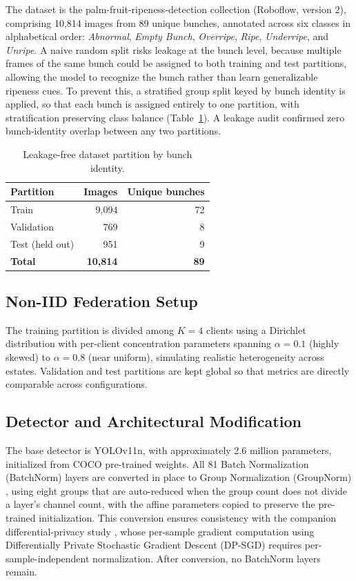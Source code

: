 \documentclass[9pt,twocolumn]{extarticle}
\begin{document}
The dataset is the palm-fruit-ripeness-detection collection (Roboflow, version 2), comprising 10,814 images from 89 unique bunches, annotated across six classes in alphabetical order: \emph{Abnormal}, \emph{Empty Bunch}, \emph{Overripe}, \emph{Ripe}, \emph{Underripe}, and \emph{Unripe}. A naive random split risks leakage at the bunch level, because multiple frames of the same bunch could be assigned to both training and test partitions, allowing the model to recognize the bunch rather than learn generalizable ripeness cues. To prevent this, a stratified group split keyed by bunch identity is applied, so that each bunch is assigned entirely to one partition, with stratification preserving class balance (Table~\ref{tab:split}). A leakage audit confirmed zero bunch-identity overlap between any two partitions.

\begin{table}[H]
  \centering
  \caption{Leakage-free dataset partition by bunch identity.}
  \label{tab:split}
  \small
  \begin{tabular}{lrr}
    \toprule
    Partition & Images & Unique bunches \\
    \midrule
    Train & 9,094 & 72 \\
    Validation & 769 & 8 \\
    Test (held out) & 951 & 9 \\
    \midrule
    \textbf{Total} & \textbf{10,814} & \textbf{89} \\
    \bottomrule
  \end{tabular}
\end{table}

\subsection{Non-IID Federation Setup}

The training partition is divided among $K=4$ clients using a Dirichlet distribution with per-client concentration parameters spanning $\alpha=0.1$ (highly skewed) to $\alpha=0.8$ (near uniform), simulating realistic heterogeneity across estates. Validation and test partitions are kept global so that metrics are directly comparable across configurations.

\subsection{Detector and Architectural Modification}

The base detector is YOLOv11n, with approximately 2.6 million parameters, initialized from COCO \cite{lin2014} pre-trained weights. All 81 Batch Normalization (BatchNorm) layers are converted in place to Group Normalization (GroupNorm) \cite{wu2018}, using eight groups that are auto-reduced when the group count does not divide a layer's channel count, with the affine parameters copied to preserve the pre-trained initialization. This conversion ensures consistency with the companion differential-privacy study \cite{dianty2026}, whose per-sample gradient computation using Differentially Private Stochastic Gradient Descent (DP-SGD) \cite{abadi2016} requires per-sample-independent normalization. After conversion, no BatchNorm layers remain.
\end{document}
